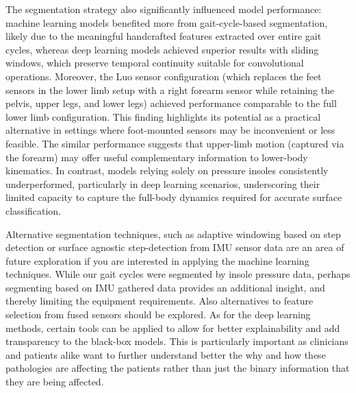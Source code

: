 \documentclass[sensors,article,submit,pdftex,moreauthors]{Definitions/mdpi}
\begin{document}
The segmentation strategy also significantly influenced model performance: machine learning models benefited more from gait-cycle-based segmentation, likely due to the meaningful handcrafted features extracted over entire gait cycles, whereas deep learning models achieved superior results with sliding windows, which preserve temporal continuity suitable for convolutional operations. Moreover, the Luo sensor configuration (which replaces the feet sensors in the lower limb setup with a right forearm sensor while retaining the pelvis, upper legs, and lower legs) achieved performance comparable to the full lower limb configuration. This finding highlights its potential as a practical alternative in settings where foot-mounted sensors may be inconvenient or less feasible. The similar performance suggests that upper-limb motion (captured via the forearm) may offer useful complementary information to lower-body kinematics. In contrast, models relying solely on pressure insoles consistently underperformed, particularly in deep learning scenarios, underscoring their limited capacity to capture the full-body dynamics required for accurate surface classification.

Alternative segmentation techniques, such as adaptive windowing based on step detection or surface agnostic step-detection from IMU sensor data are an area of future exploration if you are interested in applying the machine learning techniques. While our gait cycles were segmented by insole pressure data, perhaps segmenting based on IMU gathered data provides an additional insight, and thereby limiting the equipment requirements. Also alternatives to feature selection from fused sensors should be explored. 
As for the deep learning methods, certain tools can be applied to allow for better explainability and add transparency to the black-box models. This is particularly important as clinicians and patients alike want to further understand better the why and how these pathologies are affecting the patients rather than just the binary information that they are being affected.
\end{document}

